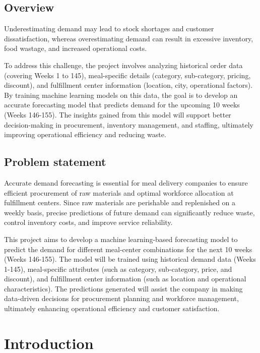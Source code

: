 \documentclass[12pt]{article}
\begin{document}
\subsection{Overview }
Underestimating demand may lead to stock shortages and customer dissatisfaction, whereas overestimating demand 
can result in excessive inventory, food wastage, and increased operational costs.

To address this challenge, the project involves analyzing historical order data (covering Weeks 1 to 145), meal-specific 
details (category, sub-category, pricing, discount), and fulfillment center information (location, city, operational factors). 
By training machine learning models on this data, the goal is to develop an accurate forecasting model that predicts 
demand for the upcoming 10 weeks (Weeks 146-155). The insights gained from this model will support better decision-making
 in procurement, inventory management, and staffing, ultimately improving operational efficiency and reducing waste.

\subsection{Problem statement}
Accurate demand forecasting is essential for meal delivery companies to ensure efficient procurement of raw materials
 and optimal workforce allocation at fulfillment centers. Since raw materials are perishable and replenished on a weekly 
basis, precise predictions of future demand can significantly reduce waste, control inventory costs, and improve service reliability.

This project aims to develop a machine learning-based forecasting model to predict the demand for different meal-center
 combinations for the next 10 weeks (Weeks 146-155). The model will be trained using historical demand data (Weeks 1-145), 
meal-specific attributes (such as category, sub-category, price, and discount), and fulfillment center information 
(such as location and operational characteristics). The predictions generated will assist the company in making data-driven 
decisions for procurement planning and workforce management, ultimately enhancing operational efficiency and customer satisfaction.


\section{Introduction}
\end{document}
